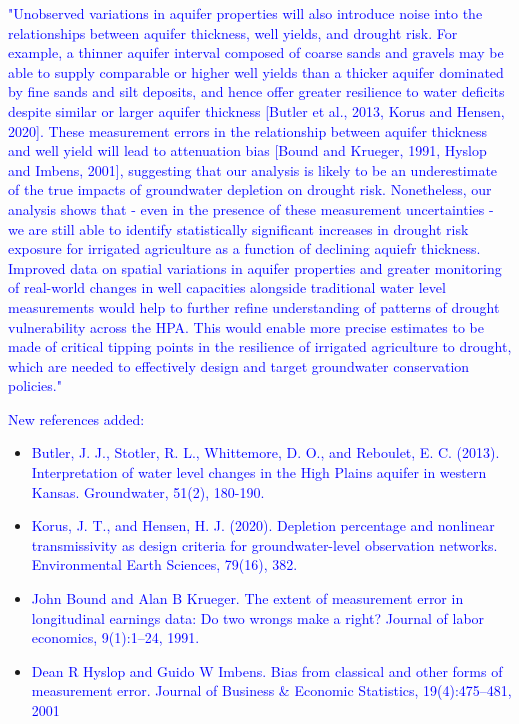 \documentclass[
]{article}
\begin{document}
\begin{itemize}
\end{itemize}

\textcolor{blue}{"Unobserved variations in aquifer properties will also introduce noise into the relationships between aquifer thickness, well yields, and drought risk. For example, a thinner aquifer interval composed of coarse sands and gravels may be able to supply comparable or higher well yields than a thicker aquifer dominated by fine sands and silt deposits, and hence offer greater resilience to water deficits despite similar or larger aquifer thickness [Butler et al., 2013, Korus and Hensen, 2020]. These measurement errors in the relationship between aquifer thickness and well yield will lead to attenuation bias [Bound and Krueger, 1991, Hyslop and Imbens, 2001], suggesting that our analysis is likely to be an underestimate of the true impacts of groundwater depletion on drought risk. Nonetheless, our analysis shows that - even in the presence of these measurement uncertainties - we are still able to identify statistically significant increases in drought risk exposure for irrigated agriculture as a function of declining aquiefr thickness. Improved data on spatial variations in aquifer properties and greater monitoring of real-world changes in well capacities alongside traditional water level measurements would help to further refine understanding of patterns of drought vulnerability across the HPA. This would enable more precise estimates to be made of critical tipping points in the resilience of irrigated agriculture to drought, which are needed to effectively design and target groundwater conservation policies."}

\textcolor{blue}{New references added:}

\begin{itemize}
\item
  \textcolor{blue}{Butler, J. J., Stotler, R. L., Whittemore, D. O., and Reboulet, E. C. (2013). Interpretation of water level changes in the High Plains aquifer in western Kansas. Groundwater, 51(2), 180-190.}
\item
  \textcolor{blue}{Korus, J. T., and Hensen, H. J. (2020). Depletion percentage and nonlinear transmissivity as design criteria for groundwater-level observation networks. Environmental Earth Sciences, 79(16), 382.}
\item
  \textcolor{blue}{John Bound and Alan B Krueger. The extent of measurement error in longitudinal earnings data: Do two wrongs make a right? Journal of labor economics, 9(1):1–24, 1991.}
\item
  \textcolor{blue}{Dean R Hyslop and Guido W Imbens. Bias from classical and other forms of measurement error. Journal of Business \& Economic Statistics, 19(4):475–481, 2001}
\end{itemize}
\end{document}
